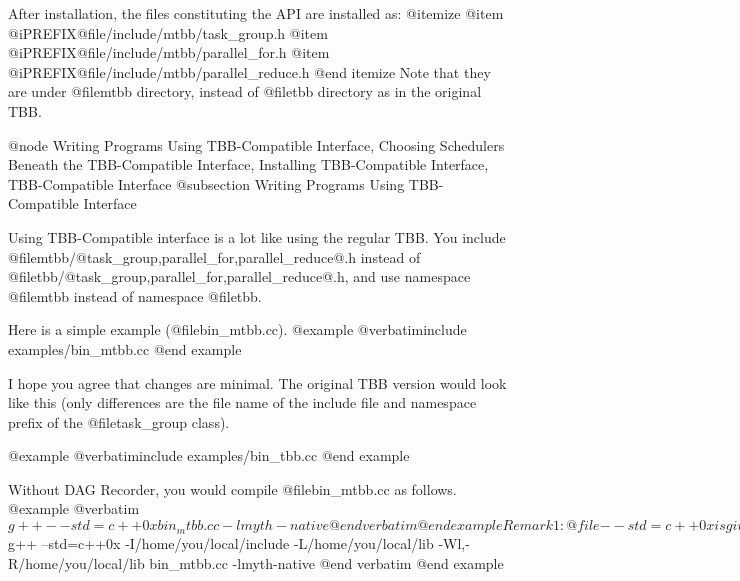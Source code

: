 After installation, the files constituting the API are installed as:
@itemize
@item @i{PREFIX}@file{/include/mtbb/task_group.h}
@item @i{PREFIX}@file{/include/mtbb/parallel_for.h}
@item @i{PREFIX}@file{/include/mtbb/parallel_reduce.h}
@end itemize
Note that they are under @file{mtbb} directory, instead of @file{tbb}
directory as in the original TBB.

@node Writing Programs Using TBB-Compatible Interface, Choosing Schedulers Beneath the TBB-Compatible Interface, Installing TBB-Compatible Interface, TBB-Compatible Interface
@subsection Writing Programs Using TBB-Compatible Interface

Using TBB-Compatible interface is a lot like using the regular TBB.  You
include @file{mtbb/@{task_group,parallel_for,parallel_reduce@}.h}
instead of @file{tbb/@{task_group,parallel_for,parallel_reduce@}.h}, and
use namespace @file{mtbb} instead of namespace @file{tbb}.

Here is a simple example (@file{bin_mtbb.cc}).
@example
@verbatiminclude examples/bin_mtbb.cc
@end example

I hope you agree that changes are minimal.  The original TBB version
would look like this (only differences are the file name of the include
file and namespace prefix of the @file{task_group} class).

@example
@verbatiminclude examples/bin_tbb.cc
@end example

Without DAG Recorder, you would compile @file{bin_mtbb.cc} as follows.
@example
@verbatim
$ g++ --std=c++0x bin_mtbb.cc -lmyth-native
@end verbatim
@end example

Remark 1: @file{--std=c++0x} is given to use C++ lambda expression at
line 8, proposed in C++0x and standardized in C++11.  GCC supports it
since 4.5, when one of the following command line options
@file{--std=c++0x, --std=gnu0x, --std=c++11}, or @file{--std=gnu11} is
supplied.  If your GCC does not support it, you could pass any callable
object (any object supporting @file{operator()}).  We use lambda
expressions for brevity in this manual.

Remark 2: Depending on your configuration, you might need to add
@file{-I, -L,} and @file{-Wl,-R} options to the command line.  For
example, if you install MassiveThreads under @file{/home/you/local} (i.e.,
gave @file{/home/you/local} to @file{--prefix} of the @file{configure}
command), the command line will be:
@example
@verbatim
$ g++ --std=c++0x -I/home/you/local/include -L/home/you/local/lib -Wl,-R/home/you/local/lib bin_mtbb.cc -lmyth-native
@end verbatim
@end example

